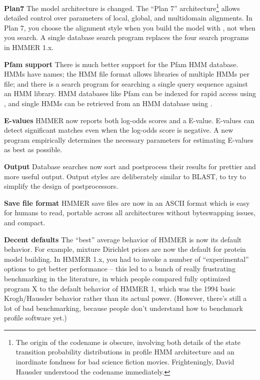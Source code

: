 \begin{wideitem}

\item [\textbf{Plan7}] The model architecture is changed. The ``Plan 7''
architecture\footnote{The origin of the codename is obscure, involving
both details of the state transition probability distributions in
profile HMM architecture and an inordinate fondness for bad science
fiction movies. Frighteningly, David Haussler understood the codename
immediately.} allows detailed control over parameters of local,
global, and multidomain alignments. In Plan 7, you choose the
alignment style when you build the model with , not
when you search. A single database search program 
replaces the four search programs in HMMER 1.x.

\item [\textbf{Pfam support}] There is much better support for the Pfam
HMM database. HMMs have names; the HMM file format allows libraries of
multiple HMMs per file; and there is a search program
for searching a single query sequence against an HMM library.
HMM databases like Pfam can be indexed for rapid access using
, and single HMMs can be retrieved from an HMM
database using .

\item [\textbf{E-values}] HMMER now reports both log-odds scores and
a E-value. E-values can detect significant matches even when the
log-odds score is negative. A new program 
empirically determines the necessary parameters for estimating
E-values as best as possible.

\item [\textbf{Output}] Database searches now sort and postprocess their results for
prettier and more useful output. Output styles are deliberately
similar to BLAST, to try to simplify the design of postprocessors.

\item [\textbf{Save file format}] HMMER save files are now in an ASCII format which
  is easy for humans to read, portable across all architectures
  without byteswapping issues, and compact.

\item [\textbf{Decent defaults}] The ``best'' average behavior of HMMER is now its
default behavior. For example, mixture Dirichlet priors are now the
default for protein model building. In HMMER 1.x, you had to invoke a
number of ``experimental'' options to get better performance -- this
led to a bunch of really frustrating benchmarking in the literature,
in which people compared fully optimized program X to the default
behavior of HMMER 1, which was the 1994 basic Krogh/Haussler behavior
rather than its actual power. (However, there's still a lot of bad
benchmarking, because people don't understand how to benchmark profile
software yet.)

\end{wideitem}

